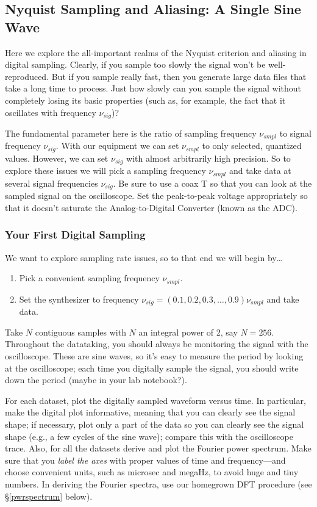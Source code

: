 \documentclass[11pt]{article}
\begin{document}
\subsection{Nyquist Sampling and Aliasing: A Single Sine Wave} \label{nyquist}

    Here we explore the all-important realms of the Nyquist
criterion and aliasing in digital sampling.  Clearly, if you sample too
slowly the signal won't be well-reproduced.  But if you sample really
fast, then you generate large data files that take a long time to
process.  Just how slowly can you sample the signal without completely
losing its basic properties (such as, for example, the fact that it
oscillates with frequency $\nu_{sig}$)?

The fundamental parameter here is the ratio of sampling frequency
$\nu_{smpl}$ to signal frequency $\nu_{sig}$. With our equipment we can set
$\nu_{smpl}$ to only selected, quantized values. However, we can set
$\nu_{sig}$ with almost arbitrarily high precision. So to explore these
issues we will pick a sampling frequency $\nu_{smpl}$ and take data at
several signal frequencies $\nu_{sig}$.  Be sure to use a coax T so that
you can look at the sampled signal on the oscilloscope.  Set the
peak-to-peak voltage appropriately so that it doesn't saturate the
Analog-to-Digital Converter (known as the ADC).

\subsubsection{Your First Digital Sampling}
    We want to explore sampling rate issues, so to that end
we will begin by\dots
\begin{enumerate}
\item Pick a convenient sampling frequency $\nu_{smpl}$.  
\item Set the synthesizer to frequency $\nu_{sig} = (0.1, 0.2,
      0.3, \dots, 0.9) \nu_{smpl}$ and take data. 
\end{enumerate}

\noindent Take $N$ contiguous samples with $N$ an integral power of 2, say
$N=256$.  Throughout the datataking, you should always be
monitoring the signal with the oscilloscope. These are sine waves, so
it's easy to measure the period by looking at the oscilloscope; each
time you digitally sample the signal, you should write down the period
(maybe in your lab notebook?).  

For each dataset, plot the digitally sampled waveform versus
time.  In particular, make the digital plot informative, meaning that
you can clearly see the signal shape; if necessary, plot only a part of
the data so you can clearly see the signal shape (e.g., a few cycles of
the sine wave); compare this with the oscilloscope trace.  Also, for all
the datasets derive and plot the Fourier power spectrum.  Make sure that
you {\it label the axes} with proper values of time and frequency---and
choose convenient units, such as microsec and megaHz, to avoid huge and
tiny numbers.  In deriving the Fourier spectra, use our homegrown DFT
procedure (see \S \ref{pwrspectrum} below).
\end{document}
